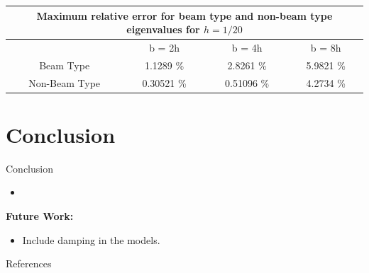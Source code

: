 \documentclass[8pt]{beamer}
\begin{document}
        \begin{frame}
            \begin{table}[htbp]
                \centering
                \begin{tabular}{|c|ccc|}
                    \hline
                    \multicolumn{4}{|c|}{Maximum relative error for beam type and non-beam type eigenvalues for $h = 1/20$} \\
                    \hline
                    \hline
                    & {b = 2h} & {b = 4h} & {b = 8h} \\
                    \hline
                    Beam Type & 1.1289 \% & 2.8261 \% & 5.9821 \% \\
                    Non-Beam Type & 0.30521 \% & 0.51096 \% & 4.2734 \% \\
                    \hline
                \end{tabular}%
                \label{tab:b>h-split_20}%
            \end{table}%
        \end{frame}

\section{Conclusion}
    \begin{frame}{Conclusion}
        \begin{itemize}
            \item 
        \end{itemize}

        \textbf{Future Work:}
        \begin{itemize}
            \item Include damping in the models.
        \end{itemize}

    \end{frame}

    \begin{frame}{References}
        \printbibliography[heading=bibintoc, title={References}]
    \end{frame}
\end{document}
